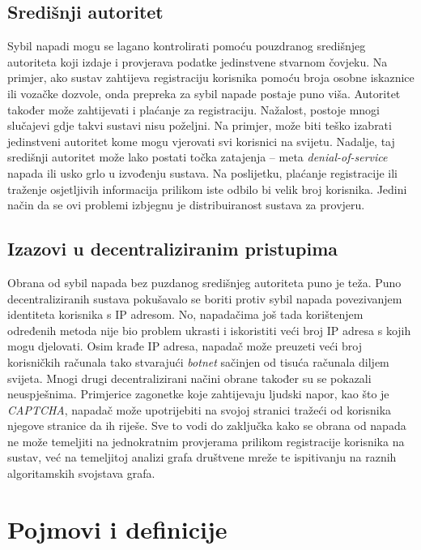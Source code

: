 \documentclass[times, utf8, seminar, numeric]{fer}
\begin{document}
\subsection{Središnji autoritet}
Sybil napadi mogu se lagano kontrolirati pomoću pouzdranog središnjeg autoriteta koji izdaje i provjerava podatke jedinstvene stvarnom čovjeku. Na primjer, ako sustav zahtijeva registraciju korisnika pomoću broja osobne iskaznice ili vozačke dozvole, onda prepreka za sybil napade postaje puno viša. Autoritet također može zahtijevati i plaćanje za registraciju. Nažalost, postoje mnogi slučajevi gdje takvi sustavi nisu poželjni. Na primjer, može biti teško izabrati jedinstveni autoritet kome mogu vjerovati svi korisnici na svijetu. Nadalje, taj središnji autoritet može lako postati točka zatajenja  -- meta \textit{denial-of-service} napada ili usko grlo u izvođenju sustava. Na poslijetku, plaćanje registracije ili traženje osjetljivih informacija prilikom iste odbilo bi velik broj korisnika. Jedini način da se ovi problemi izbjegnu je distribuiranost sustava za provjeru. \cite{sybil-guard}

\subsection{Izazovi u decentraliziranim pristupima}
Obrana od sybil napada bez puzdanog središnjeg autoriteta puno je teža. Puno decentraliziranih sustava pokušavalo se boriti protiv sybil napada povezivanjem identiteta korisnika s IP adresom. No, napadačima još tada korištenjem određenih metoda nije bio problem ukrasti i iskoristiti veći broj IP adresa s kojih mogu djelovati. \cite{spammers} Osim krađe IP adresa, napadač može preuzeti veći broj korisničkih računala tako stvarajući \textit{botnet} sačinjen od tisuća računala diljem svijeta. Mnogi drugi decentralizirani načini obrane također su se pokazali neuspješnima. Primjerice zagonetke koje zahtijevaju ljudski napor, kao što je \textit{CAPTCHA}, napadač može upotrijebiti na svojoj stranici tražeći od korisnika njegove stranice da ih riješe. Sve to vodi do zaključka kako se obrana od napada ne može temeljiti na jednokratnim provjerama prilikom registracije korisnika na sustav, već na temeljitoj analizi grafa društvene mreže te ispitivanju na raznih algoritamskih svojstava grafa. \cite{sybil-guard}

\section{Pojmovi i definicije}
\end{document}
